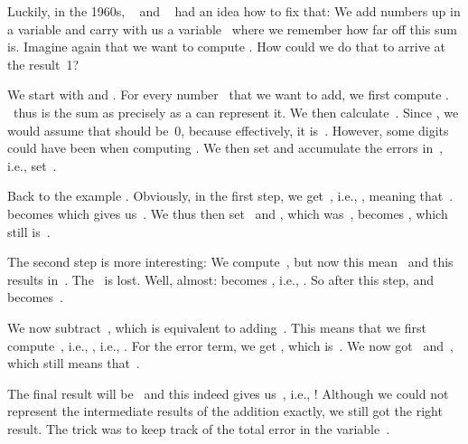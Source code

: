 Luckily, in the 1960s, \citeauthor{K1965PFRORTE}~\cite{K1965PFRORTE} and \citeauthor{B1968NSIMA}~\cite{B1968NSIMA} had an idea how to fix that:
We add numbers up in a  variable and carry with us a variable~ where we remember how far off this sum is.
Imagine again that we want to compute .
How could we do that to arrive at the result~1?

We start with  and .
For every number~ that we want to add, we first compute .
~thus is the sum as precisely as a  can represent it.
We then calculate~.
Since , we would assume that  should be~0, because effectively, it is~.
However, some digits could have been  when computing .
We then set  and accumulate the errors in~, i.e., set~.

Back to the example .
Obviously, in the first step, we get~, i.e., , meaning that~.
 becomes  which gives us~.
We thus then set~ and , which was~, becomes , which still is~.%
%
\begin{sloppypar}%
The second step is more interesting:
We compute~, but now this mean~ and this results in~.
The~ is lost.
Well, almost:
 becomes , i.e., .
So after this step,  and  becomes~.%
\end{sloppypar}%
%
\begin{sloppypar}%
We now subtract~, which is equivalent to adding~.
This means that we first compute~, i.e., , i.e., .
For the error term, we get , which is~.
We now got~ and~, which still means that~.%
\end{sloppypar}%
%
The final result will be~ and this indeed gives us~, i.e., !
Although we could not represent the intermediate results of the addition exactly, we still got the right result.
The trick was to keep track of the total error in the variable~.

